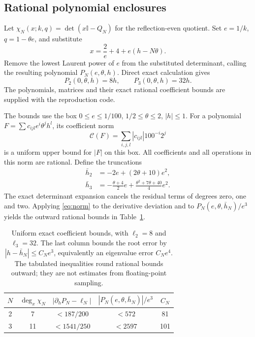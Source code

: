 \documentclass[11pt]{article}
\newcommand{\Id}{\mathbb I}
\begin{document}
\subsection{Rational polynomial enclosures}

Let $\chi_N(x;k,q)=\det(x\Id-Q_N)$ for the reflection-even quotient.
Set $e=1/k$, $q=1-\theta e$, and substitute
\begin{equation}
 x=\frac2e+4+e(h-N\theta).
 \label{eq:scaled}
\end{equation}
Remove the lowest Laurent power of $e$ from the substituted determinant,
calling the resulting polynomial $P_N(e,\theta,h)$. Direct exact
calculation gives
\begin{equation}
 P_2(0,\theta,h)=8h,\qquad P_3(0,\theta,h)=32h.
 \label{eq:leading}
\end{equation}
The polynomials, matrices and their exact rational coefficient bounds
are supplied with the reproduction code.

The bounds use the box
$0\leq e\leq1/100$, $1/2\leq\theta\leq2$, $|h|\leq1$.
For a polynomial $F=\sum c_{ijl}e^i\theta^j h^l$, its coefficient norm
\begin{equation}
 \mathcal C(F)=\sum_{i,j,l}|c_{ijl}|100^{-i}2^j
 \label{eq:norm}
\end{equation}
is a uniform upper bound for $|F|$ on this box. All coefficients
and all operations in this norm are rational. Define the truncations
\begin{align}
 \bar h_2&=-2e+(2\theta+10)e^2,\label{eq:h2}\\
 \bar h_3&=-\frac{\theta+4}{2}e
              +\frac{\theta^2+7\theta+40}{4}e^2.\label{eq:h3}
\end{align}
The exact determinant expansion cancels the residual terms of degrees
zero, one and two. Applying \eqref{eq:norm} to the derivative deviation
and to $P_N(e,\theta,\bar h_N)/e^3$ yields the outward rational bounds
in Table~\ref{tab:bounds}.

\begin{table}[htbp]
\centering
\begin{tabular}{@{}ccccc@{}}
\toprule
$N$ & $\deg_x\chi_N$ & $|\partial_h P_N-\ell_N|$
    & $|P_N(e,\theta,\bar h_N)|/e^3$ & $C_N$\\
\midrule
2 & 7  & $<187/200$  & $<572$  & 81\\
3 & 11 & $<1541/250$ & $<2597$ & 101\\
\bottomrule
\end{tabular}
\caption{Uniform exact coefficient bounds, with $\ell_2=8$ and
$\ell_3=32$. The last column bounds the root error by
$|h-\bar h_N|\leq C_Ne^3$, equivalently an eigenvalue error
$C_Ne^4$. The tabulated inequalities round rational bounds outward;
they are not estimates from floating-point sampling.}
\label{tab:bounds}
\end{table}
\end{document}
